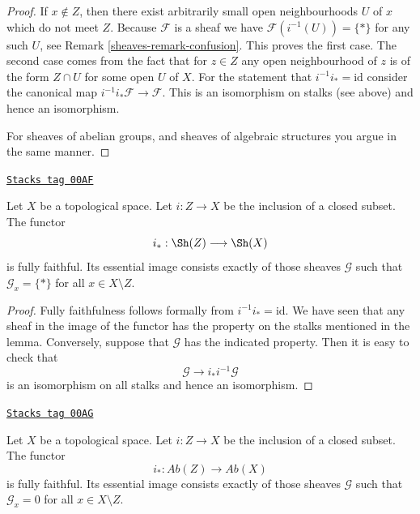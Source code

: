 \begin{proof}

If $x \not \in Z$, then there exist arbitrarily small open
neighbourhoods $U$ of $x$ which do not meet $Z$.
Because $\mathcal{F}$ is a sheaf
we have $\mathcal{F}(i^{-1}(U)) = \{*\}$ for any such $U$,
see Remark \ref{sheaves-remark-confusion}. This proves the first case.
The second case comes from the fact that for $z \in Z$
any open neighbourhood of $z$ is of the form $Z \cap U$ for
some open $U$ of $X$. For the statement that
$i^{-1}i_* = \text{id}$ consider the canonical map
$i^{-1}i_*\mathcal{F} \to \mathcal{F}$. This is an isomorphism
on stalks (see above) and hence an isomorphism.

\medskip\noindent
For sheaves of abelian groups, and sheaves of algebraic structures
you argue in the same manner.
\end{proof}


\begin{lemma}
\label{sheaves-lemma-equivalence-categories-closed}
\href{https://stacks.math.columbia.edu/tag/00AF}{\texttt{Stacks tag 00AF}}

Let $X$ be a topological space.
Let $i : Z \to X$ be the inclusion of a closed subset.
The functor
$$
i_* : \Sh(Z) \longrightarrow \Sh(X)
$$
is fully faithful. Its essential image consists exactly
of those sheaves $\mathcal{G}$ such that
$\mathcal{G}_x = \{*\}$ for all $x \in X \setminus Z$.
\end{lemma}

\begin{proof}
Fully faithfulness follows formally from $i^{-1} i_* = \text{id}$.
We have seen that any sheaf in the image of the functor has
the property on the stalks mentioned in the lemma. Conversely, suppose
that $\mathcal{G}$ has the indicated property.
Then it is easy to check that
$$
\mathcal{G} \to i_* i^{-1} \mathcal{G}
$$
is an isomorphism on all stalks and hence an isomorphism.
\end{proof}

\begin{lemma}
\label{sheaves-lemma-equivalence-categories-closed-abelian}
\href{https://stacks.math.columbia.edu/tag/00AG}{\texttt{Stacks tag 00AG}}

Let $X$ be a topological space.
Let $i : Z \to X$ be the inclusion of a closed subset.
The functor
$$
i_* : \textit{Ab}(Z) \longrightarrow \textit{Ab}(X)
$$
is fully faithful. Its essential image consists exactly
of those sheaves $\mathcal{G}$ such that
$\mathcal{G}_x = 0$ for all $x \in X \setminus Z$.
\end{lemma}


